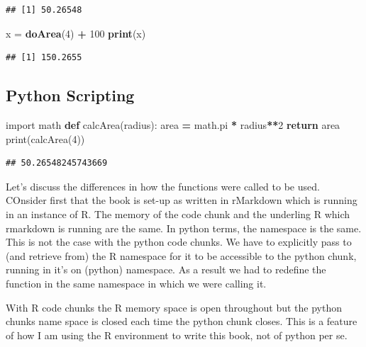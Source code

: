 \documentclass[]{book}
\newenvironment{Shaded}{\begin{snugshade}}{\end{snugshade}}
\newcommand{\KeywordTok}[1]{\textcolor[rgb]{0.13,0.29,0.53}{\textbf{#1}}}
\newcommand{\DecValTok}[1]{\textcolor[rgb]{0.00,0.00,0.81}{#1}}
\newcommand{\StringTok}[1]{\textcolor[rgb]{0.31,0.60,0.02}{#1}}
\newcommand{\ImportTok}[1]{#1}
\newcommand{\ControlFlowTok}[1]{\textcolor[rgb]{0.13,0.29,0.53}{\textbf{#1}}}
\newcommand{\OperatorTok}[1]{\textcolor[rgb]{0.81,0.36,0.00}{\textbf{#1}}}
\newcommand{\BuiltInTok}[1]{#1}
\newcommand{\NormalTok}[1]{#1}
\theoremstyle{definition}
\theoremstyle{definition}
\theoremstyle{definition}
\theoremstyle{remark}
\begin{document}
\begin{verbatim}
## [1] 50.26548
\end{verbatim}

\begin{Shaded}
\begin{Highlighting}[]
\NormalTok{x =}\StringTok{ }\KeywordTok{doArea}\NormalTok{(}\DecValTok{4}\NormalTok{) }\OperatorTok{+}\StringTok{ }\DecValTok{100}
\KeywordTok{print}\NormalTok{(x)}
\end{Highlighting}
\end{Shaded}

\begin{verbatim}
## [1] 150.2655
\end{verbatim}

\subsection{Python Scripting}\label{python-scripting-2}

\begin{Shaded}
\begin{Highlighting}[]
\ImportTok{import}\NormalTok{ math}
\KeywordTok{def}\NormalTok{ calcArea(radius):}
\NormalTok{  area }\OperatorTok{=}\NormalTok{ math.pi }\OperatorTok{*}\NormalTok{ radius}\OperatorTok{**}\DecValTok{2}
  \ControlFlowTok{return}\NormalTok{ area}
\BuiltInTok{print}\NormalTok{(calcArea(}\DecValTok{4}\NormalTok{))}
\end{Highlighting}
\end{Shaded}

\begin{verbatim}
## 50.26548245743669
\end{verbatim}

Let's discuss the differences in how the functions were called to be
used. COnsider first that the book is set-up as written in rMarkdown
which is running in an instance of R. The memory of the code chunk and
the underling R which rmarkdown is running are the same. In python
terms, the namespace is the same. This is not the case with the python
code chunks. We have to explicitly pass to (and retrieve from) the R
namespace for it to be accessible to the python chunk, running in it's
on (python) namespace. As a result we had to redefine the function in
the same namespace in which we were calling it.

With R code chunks the R memory space is open throughout but the python
chunks name space is closed each time the python chunk closes. This is a
feature of how I am using the R environment to write this book, not of
python per se.
\end{document}
